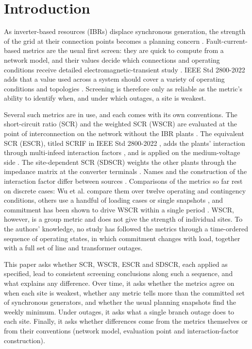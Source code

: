 \section{Introduction}
\label{sec:introduction}

As inverter-based resources (IBRs) displace synchronous generation, the strength of the grid at
their connection points becomes a planning concern \cite{SvK2025, fingrid2023, Denholm2022, NERC2018}. Fault-current-based metrics are the
usual first screen: they are quick to compute from a network model, and their values decide
which connections and operating conditions receive detailed electromagnetic-transient study
\cite{ieee2800,nerc2017,cigre671}. IEEE Std 2800-2022 adds that a value used across a system
should cover a variety of operating conditions and topologies \cite{ieee2800}. Screening is
therefore only as reliable as the metric's ability to identify when, and under which outages, a
site is weakest.

Several such metrics are in use, and each comes with its own conventions. The short-circuit ratio
(SCR) and the weighted SCR (WSCR) are evaluated at the point of interconnection on the network
without the IBR plants \cite{ieee2800,zhang2014}. The equivalent SCR (ESCR), titled SCRIF in IEEE
Std 2800-2022 \cite{ieee2800,cigre671}, adds the plants' interaction through multi-infeed interaction
factors \cite{cigre364}, and is applied on the medium-voltage side \cite{fingrid2023}. The
site-dependent SCR (SDSCR) weights the other plants through the impedance matrix at the converter
terminals \cite{wu2018}. Names and the construction of the interaction factor differ between
sources \cite{joswigjones2026,goonasekara2023,darii2026}. Comparisons of the metrics so far rest
on discrete cases: Wu et al. \cite{wu2018} compare them over twelve operating and
contingency conditions, others use a handful of loading cases or single snapshots
\cite{sanni2022,dhungana2026,khamees2026,rosengren2025}, and commitment has been shown to drive
WSCR within a single period \cite{kim2025}. WSCR, however, is a group metric and does not give the strength of individual sites.
To the authors' knowledge, no study has followed the
metrics through a time-ordered sequence of operating states, in which commitment changes with
load, together with a full set of line and transformer outages.

This paper asks whether SCR, WSCR, ESCR and SDSCR, each applied as specified, lead to consistent
screening conclusions along such a sequence, and what explains any difference. Over time, it asks
whether the metrics agree on when each site is weakest, whether any metric tells more than the
committed set of synchronous generators, and whether the usual planning snapshots find the weekly
minimum. Under outages, it asks what a single branch outage does to each site. Finally, it asks whether
differences come from the metrics themselves or from their conventions (network model, evaluation
point and interaction-factor construction).

